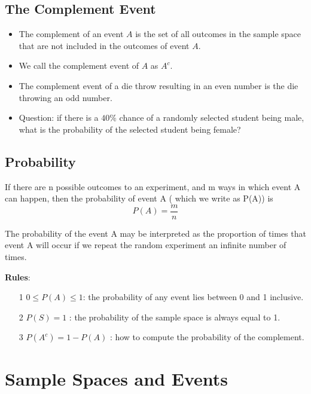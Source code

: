 \documentclass[]{report}
\begin{document}
{{{\subsection{The Complement Event}

\begin{itemize}

\item The complement of an event $A$ is the set of all outcomes in the sample
space that are not included in the outcomes of event $A$.
\item We call the complement event of $A$ as $A^c$.
\item The complement event of a die throw resulting in an even number is the
die throwing an odd number.
\item Question: if there is a $40\%$ chance of a randomly selected student being male, what is the probability of the selected student being female?
\end{itemize}


\subsection{Probability}
If there are n possible outcomes to an experiment, and m ways in which event
A can happen, then the probability of event A ( which we write as P(A)) is
\[ P(A) = \frac{m}{n} \]

The probability of the event A may be interpreted as the proportion of times
that event A will occur if we repeat the random experiment an infinite number
of times.\\ \bigskip

\textbf{Rules}:\\
\begin{itemize}
\item[1] $0 \leq P(A) \leq 1 $: the probability of any event lies between 0 and 1
inclusive.
\item[2] $P(S) = 1$ : the probability of the sample space is always equal to 1.
\item[3] $P(A^c) = 1-P(A)$ : how to compute the probability of the complement.
\end{itemize}

\section{Sample Spaces and Events}





}}}
\end{document}

